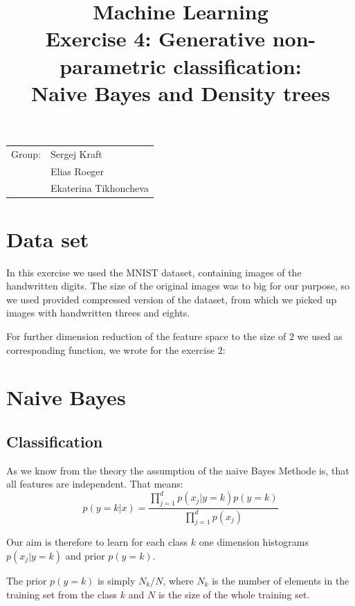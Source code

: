 \documentclass{article}
\title{Machine Learning \\ \bf{Exercise 4: Generative non-parametric classification:\\
								Naive Bayes and Density trees} } %
\begin{document}
\maketitle

\begin{center}
\begin{tabular}{l l}
Group: &  Sergej Kraft \\
       & Elias Roeger \\
       & Ekaterina Tikhoncheva \\ 
\end{tabular}
\end{center}

\tableofcontents

\section{Data set}

In this exercise we used the MNIST dataset, containing images of the handwritten digits. The size of the original images was to big for our purpose, so we used provided compressed version of the dataset, from which we picked up images with handwritten threes and eights.

For further dimension reduction of the feature space to the size of $2$ we used as corresponding function, we wrote for the exercise $2$: 



\FloatBarrier

\section{Naive Bayes}

\subsection{Classification}

As we know from the theory the assumption of the naive Bayes Methode is, that all features are independent. That means:
$$p(y=k|x)=\frac{\prod_{j=1}^d p(x_j|y=k) p(y=k)}{\prod_{j=1}^d p(x_j)}$$

Our aim is therefore to learn for each class $k$ one dimension histograms $p(x_j|y=k)$ and prior $p(y=k)$.

The prior $p(y=k)$ is simply $N_k/N$, where $N_k$ is the number of elements in the training set from the class $k$ and $N$ is the size of the whole training set.
\end{document}
